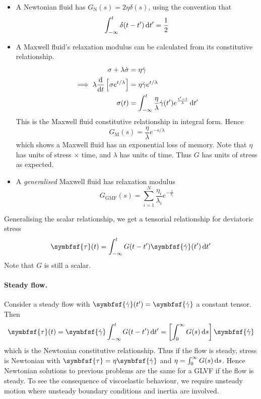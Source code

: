 \documentclass{jknotes}
\begin{document}
\begin{itemize}
	\item A Newtonian fluid has $G_{\text{N}}(s) = 2 \eta \delta(s)$, using the
		convention that
		\begin{equation}
			\int_{-\infty}^t \delta(t-t')\,\diffd t' = \frac{1}{2}
		\end{equation}
	\item A Maxwell fluid's relaxation modulus can be calculated from its
		constitutive relationship.
		\begin{align}
			\sigma + \lambda \dot{\sigma} &= \eta \srate \\
			\implies \lambda \frac{\diffd}{\diffd t}\left[\sigma
			e^{t/\lambda}\right] &= \eta \srate e^{t/\lambda} \\
			\sigma(t) &= \int_{-\infty}^t \frac{\eta}{\lambda} \srate(t')
				e^{\frac{t'-t}{\lambda}} \, \diffd t'
		\end{align}
		This is the Maxwell fluid constitutive relationship in integral form.
		Hence
		\begin{equation}
			G_{\text{M}}(s) = \frac{\eta}{\lambda} e^{-s/\lambda}
		\end{equation}
		which shows a Maxwell fluid has an exponential loss of memory. Note
		that $\eta$ has units of stress $\times$ time, and $\lambda$ has units
		of time. Thus $G$ has units of stress as expected.
	\item A \emph{generalised} Maxwell fluid has relaxation modulus
		\begin{equation}
			G_{\text{GMF}}(s) = \sum_{i=1}^N \frac{\eta_i}{\lambda_i}
			e^{-\frac{s}{\lambda_i}}
		\end{equation}
\end{itemize}

Generalising the scalar relationship, we get a tensorial relationship for
deviatoric stress
\begin{equation}
	\symbfsf{\tau}(t) = \int_{-\infty}^t G(t-t') \symbfsf{\srate}(t')\,\diffd t'
\end{equation}
Note that $G$ is still a scalar.

\paragraph{Steady flow.} Consider a steady flow with $\symbfsf{\srate}(t') =
\symbfsf{\srate}$ a constant tensor. Then
\begin{equation}
	\symbfsf{\tau}(t) = \symbfsf{\srate} \int_{-\infty}^t G(t-t') \, \diffd t' =
	\left[ \int_0^\infty G(s) \, \diffd s \right] \symbfsf{\srate}
\end{equation}
which is the Newtonian constitutive relationship. Thus if the flow is steady,
stress is Newtonian with $\symbfsf{\tau} = \eta \symbfsf{\srate}$ and $\eta =
\int_0^\infty G(s) \, \diffd s$. Hence Newtonian solutions to previous
problems are the same for a GLVF if the flow is steady. To see the consequence
of viscoelastic behaviour, we require unsteady motion where unsteady boundary
conditions and inertia are involved.
\end{document}
